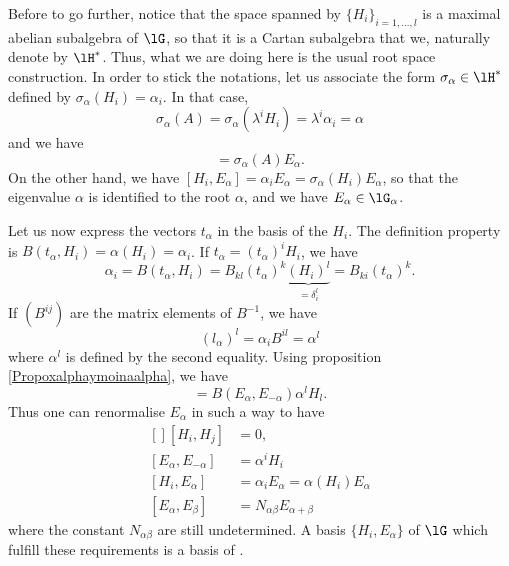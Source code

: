 Before to go further, notice that the space spanned by $\{ H_i \}_{i=1,\ldots,l}$ is a maximal abelian subalgebra of $\lG$, so that it is a Cartan subalgebra that we,  naturally denote by $\lH^*$. Thus, what we are doing here is the usual root space construction. In order to stick the notations, let us associate the form $\sigma_{\alpha}\in\lH^*$ defined by $\sigma_{\alpha}(H_i)=\alpha_i$. In that case,
\begin{equation}
    \sigma_{\alpha}(A)=\sigma_{\alpha}(\lambda^iH_i)=\lambda^i\alpha_i=\alpha
\end{equation}
and we have
\begin{equation}
    [A,E_{\alpha}]=\sigma_{\alpha}(A)E_{\alpha}.
\end{equation}
On the other hand, we have $[H_i,E_{\alpha}]=\alpha_iE_{\alpha}=\sigma_{\alpha}(H_i)E_{\alpha}$, so that the eigenvalue $\alpha$ is identified to the root $\alpha$, and we have $E_{\alpha}\in\lG_{\alpha}$.

Let us now express the vectors $t_{\alpha}$ in the basis of the $H_i$. The definition property is $B(t_{\alpha},H_i)=\alpha(H_i)=\alpha_i$. If $t_{\alpha}=(t_{\alpha})^iH_i$, we have
\begin{equation}
    \alpha_i=B(t_{\alpha},H_i)=B_{kl}(t_{\alpha})^k\underbrace{(H_i)^l}_{=\delta^l_i}=B_{ki}(t_{\alpha})^k.
\end{equation}
If $(B^{ij})$ are the matrix elements of $B^{-1}$, we have
\begin{equation}
    (l_{\alpha})^l=\alpha_iB^{il}=\alpha^l
\end{equation}
where $\alpha^l$ is defined by the second equality. Using proposition \ref{Propoxalphaymoinaalpha}, we have
\begin{equation}
    [E_{\alpha},E_{-\alpha}]=B(E_{\alpha},E_{-\alpha})\alpha^lH_l.
\end{equation}
Thus one can renormalise $E_{\alpha}$ in such a way to have
\begin{equation}
    \begin{aligned}[]
        [H_i,H_j]       &=0,\\
        [E_{\alpha},E_{-\alpha}]    &=\alpha^iH_i\\
        [H_i,E_{\alpha}]    &=\alpha_iE_{\alpha}=\alpha(H_i)E_{\alpha}\\
        [E_{\alpha},E_{\beta}]  &=N_{\alpha\beta}E_{\alpha+\beta}
    \end{aligned}
\end{equation}
where the constant $N_{\alpha\beta}$ are still undetermined. A basis $\{ H_i,E_{\alpha} \}$ of $\lG$ which fulfill these requirements is a basis of .


